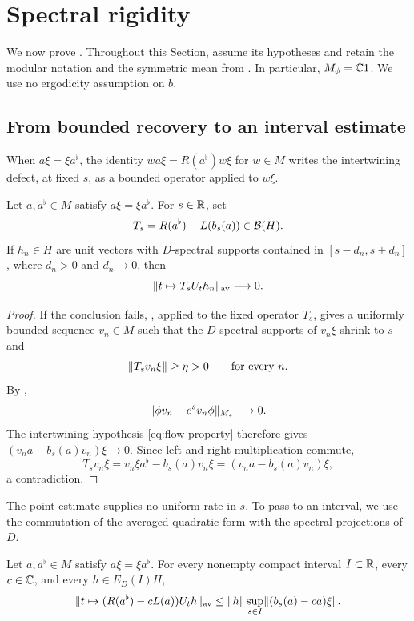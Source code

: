 \section{Spectral rigidity}
\label{sec:rigidity}

We now prove . Throughout this Section, assume its
hypotheses and retain the modular notation and the symmetric mean from
. In particular, $M_\phi=\mathbb C1$. We use no ergodicity
assumption on $b$.

\subsection{From bounded recovery to an interval estimate}

When $a\xi=\xi a^\flat$, the identity $wa\xi=R(a^\flat)w\xi$ for
$w\in M$ writes the intertwining defect, at fixed $s$, as a bounded
operator applied to $w\xi$.

\begin{lemma}
\label{spec:point}
Let $a,a^\flat\in M$ satisfy $a\xi=\xi a^\flat$. For $s\in\mathbb R$, set
\[
 T_s=R(a^\flat)-L(b_s(a))\in\mathcal B(H).
\]
If $h_n\in H$ are unit vectors with $D$-spectral supports contained in
$[s-d_n,s+d_n]$, where $d_n>0$ and $d_n\to0$, then
\begin{equation}
 \lVert t\mapsto T_sU_th_n\rVert_{\mathrm{av}}\longrightarrow0.
 \label{eq:point-estimate}
\end{equation}
\end{lemma}

\begin{proof}
If the conclusion fails, , applied to the fixed operator
$T_s$, gives a uniformly bounded sequence $v_n\in M$ such that the
$D$-spectral supports of $v_n\xi$ shrink to $s$ and
\[
 \lVert T_sv_n\xi\rVert\geq\eta>0
 \qquad\text{for every }n.
\]
By ,
\[
 \lVert\phi v_n-e^s v_n\phi\rVert_{M_*}\longrightarrow0.
\]
The intertwining hypothesis \eqref{eq:flow-property} therefore gives
$(v_na-b_s(a)v_n)\xi\to0$. Since left and right multiplication commute,
\[
 T_sv_n\xi
   =v_n\xi a^\flat-b_s(a)v_n\xi
   =(v_na-b_s(a)v_n)\xi,
\]
a contradiction.
\end{proof}

The point estimate supplies no uniform rate in $s$. To pass to an interval,
we use the commutation of the averaged quadratic form with the spectral
projections of $D$.

\begin{lemma}
\label{spec:interval}
Let $a,a^\flat\in M$ satisfy $a\xi=\xi a^\flat$. For every nonempty compact
interval $I\subset\mathbb R$, every $c\in\mathbb C$, and every $h\in E_D(I)H$,
\begin{equation}
 \lVert t\mapsto (R(a^\flat)-cL(a))U_th\rVert_{\mathrm{av}}
 \leq \lVert h\rVert\sup_{s\in I}\lVert(b_s(a)-ca)\xi\rVert.
 \label{eq:interval-estimate}
\end{equation}
\end{lemma}

